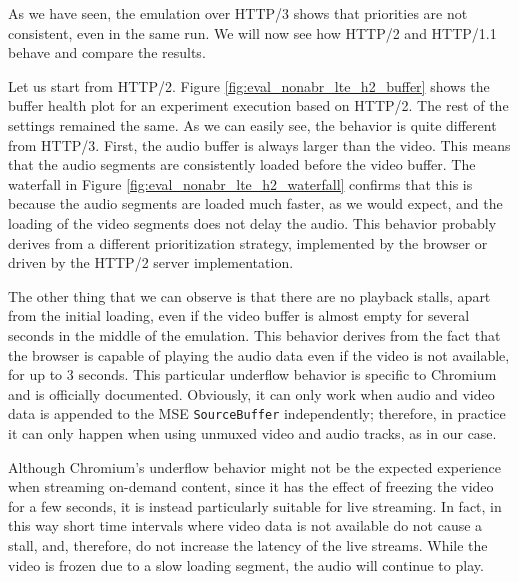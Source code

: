 As we have seen, the emulation over HTTP/3 shows that priorities are not consistent, even in the same run. We will now see how HTTP/2 and HTTP/1.1 behave and compare the results.

Let us start from HTTP/2. Figure \ref{fig:eval_nonabr_lte_h2_buffer} shows the buffer health plot for an experiment execution based on HTTP/2. The rest of the settings remained the same. As we can easily see, the behavior is quite different from HTTP/3. First, the audio buffer is always larger than the video. This means that the audio segments are consistently loaded before the video buffer. The waterfall in Figure \ref{fig:eval_nonabr_lte_h2_waterfall} confirms that this is because the audio segments are loaded much faster, as we would expect, and the loading of the video segments does not delay the audio. This behavior probably derives from a different prioritization strategy, implemented by the browser or driven by the HTTP/2 server implementation.

The other thing that we can observe is that there are no playback stalls, apart from the initial loading, even if the video buffer is almost empty for several seconds in the middle of the emulation. This behavior derives from the fact that the browser is capable of playing the audio data even if the video is not available, for up to 3 seconds. This particular underflow behavior is specific to Chromium and is officially documented. Obviously, it can only work when audio and video data is appended to the MSE \texttt{SourceBuffer} independently; therefore, in practice it can only happen when using unmuxed video and audio tracks, as in our case.

Although Chromium's underflow behavior might not be the expected experience when streaming on-demand content, since it has the effect of freezing the video for a few seconds, it is instead particularly suitable for live streaming. In fact, in this way short time intervals where video data is not available do not cause a stall, and, therefore, do not increase the latency of the live streams. While the video is frozen due to a slow loading segment, the audio will continue to play.

